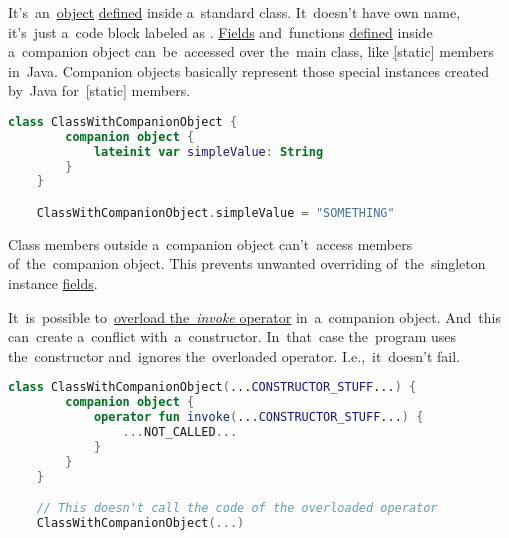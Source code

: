 \label{kotlincompanionobject}
It's~an~\hyperref[kotlinobject]{object} \hyperref[declarationdefinition]{defined} inside a~standard class.
It~doesn't have own name, it's~just a~code block labeled as .
\hyperref[variablefieldproperty]{Fields} and~functions \hyperref[declarationdefinition]{defined} inside a~companion object can~be~accessed over the~main class, like \hyperref[javastatic][static] members in~Java.
Companion objects basically represent those special instances created by~Java for~\hyperref[javastatic][static] members.

\begin{lstlisting}[language=Kotlin]
    class ClassWithCompanionObject {
        companion object {
            lateinit var simpleValue: String
        }
    }

    ClassWithCompanionObject.simpleValue = "SOMETHING"
\end{lstlisting}

\note Class members outside a~companion object can't~access members of~the~companion object.
This prevents unwanted overriding of~the~singleton instance \hyperref[variablefieldproperty]{fields}.

It~is~possible to~\hyperref[kotlininvokeoverload]{overload \mbox{the \textit{invoke}} operator} in~a~companion object.
And~this can~create a~conflict with~a~constructor.
In~that~case the~program uses the~constructor and~ignores the~overloaded operator.
I.e.,~it~doesn't fail.

\begin{lstlisting}[language=Kotlin]
    class ClassWithCompanionObject(...CONSTRUCTOR_STUFF...) {
        companion object {
            operator fun invoke(...CONSTRUCTOR_STUFF...) {
                ...NOT_CALLED...
            }
        }
    }

    // This doesn't call the code of the overloaded operator
    ClassWithCompanionObject(...)
\end{lstlisting}
